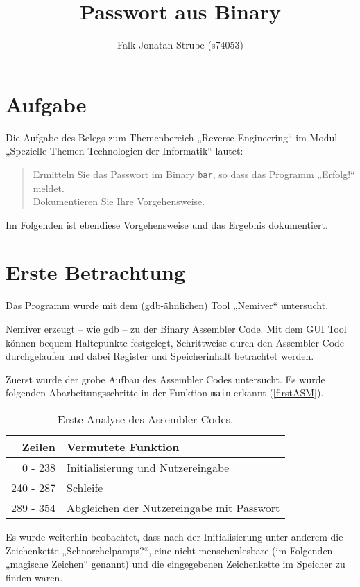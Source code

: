 \documentclass{scrartcl}
\title{Passwort aus Binary}
\author{Falk-Jonatan Strube (s74053)}
\begin{document}
\maketitle
\tableofcontents
\section{Aufgabe}
Die Aufgabe des Belegs zum Themenbereich „Reverse Engineering“ im Modul „Spezielle Themen-Technologien der Informatik“ lautet:
\begin{quote}
Ermitteln Sie das Passwort im Binary \texttt{bar}, so dass das Programm „Erfolg!“ meldet.\\
Dokumentieren Sie Ihre Vorgehensweise.
\end{quote}
Im Folgenden ist ebendiese Vorgehensweise und das Ergebnis dokumentiert.

\section{Erste Betrachtung}
Das Programm wurde mit dem (gdb-ähnlichen) Tool „Nemiver“ untersucht.

Nemiver erzeugt -- wie gdb -- zu der Binary Assembler Code. Mit dem GUI Tool können bequem Haltepunkte festgelegt, Schrittweise durch den Assembler Code durchgelaufen und dabei Register und Speicherinhalt betrachtet werden.\bigskip

Zuerst wurde der grobe Aufbau des Assembler Codes untersucht. Es wurde folgenden Abarbeitungsschritte in der Funktion \lstinline`main` erkannt (\autoref{firstASM}).

\begin{table}[!ht]
\centering
\begin{tabular}{r l}
Zeilen & Vermutete Funktion\\\hline
  0 - 238 & Initialisierung und Nutzereingabe\\
240 - 287 & Schleife\\
289 - 354 & Abgleichen der Nutzereingabe mit Passwort\\
\end{tabular}
\caption{Erste Analyse des Assembler Codes.}
\label{firstASM}
\end{table}

Es wurde weiterhin beobachtet, dass nach der Initialisierung unter anderem die Zeichenkette „Schnorchelpamps?“, eine nicht menschenlesbare (im Folgenden „magische Zeichen“ genannt) und die eingegebenen Zeichenkette im Speicher zu finden waren.
\end{document}

